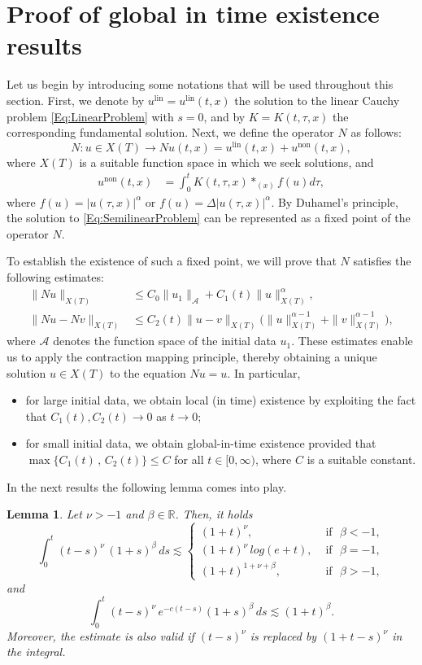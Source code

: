 \documentclass[10pt]{article}
\newtheorem{lemma}{Lemma}[section]
\newcommand{\<}{\langle}
\renewcommand{\>}{\rangle}
\DeclareMathOperator{\lin}{lin}
\DeclareMathOperator{\nl}{non}
\numberwithin{equation}{section}
\begin{document}
\section{Proof of global in time existence results} \label{Sec:Proofs}
Let us begin by introducing some notations that will be used throughout this section. First, we denote by $u^{\lin}=u^{\lin}(t,x)$ the solution to the linear Cauchy problem \eqref{Eq:LinearProblem} with $s=0$, and by $K=K(t,\tau,x)$ the corresponding fundamental solution. Next, we define the operator $N$ as follows:
\[ N: u\in X(T) \rightarrow Nu(t,x) =  u^{\lin}(t,x)+u^{\nl}(t,x), \]
where $X(T)$ is a suitable function space in which we seek solutions, and
\begin{align*}
u^{\nl}(t,x) &= \int_0^tK(t,\tau,x)\ast_{(x)}f(u)d\tau,
\end{align*}
where $f(u)=|u(\tau,x)|^\alpha$ or $f(u)=\Delta|u(\tau,x)|^\alpha$. By Duhamel's principle, the solution to \eqref{Eq:SemilinearProblem} can be represented as a fixed point of the operator $N$.

To establish the existence of such a fixed point, we will prove that $N$ satisfies the following estimates:
\begin{align}
\label{Eq:inequality-Nu} \|Nu\|_{X(T)} &\leq C_0\| u_1\|_{\mathcal{A}} + C_1(t)\|u\|_{X(T)}^\alpha, \\
\label{Eq:inequality-NuNv} \|Nu-Nv\|_{X(T)} &\leq C_2(t)\|u-v\|_{X(T)}\big( \|u\|_{X(T)}^{\alpha-1}  + \|v\|_{X(T)}^{\alpha-1} \big),
\end{align}
where $\mathcal{A}$ denotes the function space of the initial data $u_1$. These estimates enable us to apply the contraction mapping principle, thereby obtaining a unique solution $u\in X(T)$ to the equation $Nu=u$. In particular,
\begin{itemize}
\item for large initial data, we obtain local (in time) existence by exploiting the fact that $C_1(t), C_2(t)\to 0$ as $t\to 0$;
\item for small initial data, we obtain global-in-time existence provided that $\max\{C_1(t)\,,\, C_2(t)\}\leq C$ for all $t\in [0, \infty)$, where $C$ is a suitable constant.
\end{itemize}
In the  next results the following lemma comes into play.
\begin{lemma}\label{Lem:Auxiliary-GlobalExistence}
Let $\nu >-1$ and $\beta \in \mathbb{R}$. Then, it holds
\begin{equation*}
\int_{0}^{t}(t-s)^{\nu}\,(1+s)^{\beta}\,ds\lesssim
\begin{cases}
(1+t)^{\nu}, &   \mbox{ if }\,\, \beta <-1,\\
(1+t)^{\nu}\,log(e+t), &  \mbox{ if }\,\, \beta =-1,\\
(1+t)^{1+\nu+\beta}, &  \mbox{ if }\,\,  \beta >-1,
\end{cases}
\end{equation*}
and
\[\int_{0}^{t}(t-s)^{\nu}\,e^{-c(t-s)}(1+s)^{\beta}\,ds\lesssim (1+t)^\beta .\]
Moreover, the estimate is also valid if $(t-s)^{\nu}$ is replaced by $(1+t-s)^{\nu}$ in the integral.
\end{lemma}
\end{document}
